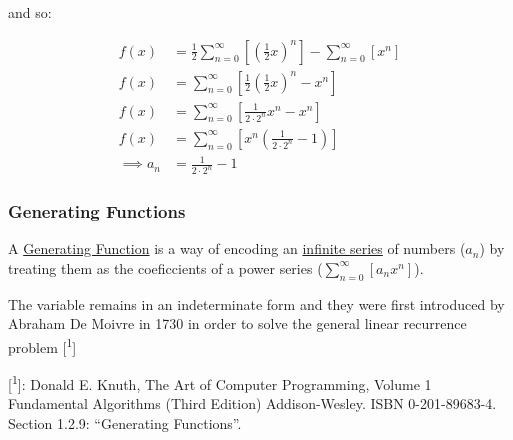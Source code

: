 \documentclass[11pt]{article}
\begin{document}
and so:

\begin{align*}
f\left( x \right) &= \frac{1}{2}\sum^{\infty}_{n= 0}\left[ \left( \frac{1}{2}x \right) ^n \right] - \sum^{\infty}_{n= 0}\left[ x^n \right] \\
f\left( x \right) &= \sum^{\infty}_{n= 0}\left[ \frac{1}{2}\left( \frac{1}{2}x \right) ^n -x^n \right]  \\
f\left( x \right) &= \sum^{\infty}_{n= 0}\left[ \frac{1}{2 \cdot 2^n} x^n -x^n \right]  \\
f\left( x \right) &= \sum^{\infty}_{n= 0}\left[x^n {\left( {\frac{1}{2 \cdot 2^n} -1} \right) } \right]  \\
 \implies  a_n &= \frac{1}{2 \cdot 2^n} - 1
\end{align*}

\subsubsection{Generating Functions}
\label{sec:orgdfa6c3d}
A \href{https://en.wikipedia.org/wiki/Generating\_function}{Generating
Function} is a way of encoding an
\href{https://en.wikipedia.org/wiki/Infinite\_sequence}{infinite series} of
numbers (\(a_n\)) by treating them as the coeficcients of a power series
(\(\sum^\infty_{n = 0} \left[ a_nx^n \right]\)).

The variable remains in an indeterminate form and they were first
introduced by Abraham De Moivre in 1730 in order to solve the general
linear recurrence problem [\textsuperscript{1}]

[\textsuperscript{1}]: Donald E. Knuth, The Art of Computer Programming, Volume 1
Fundamental Algorithms (Third Edition) Addison-Wesley. ISBN
0-201-89683-4. Section 1.2.9: ``Generating Functions''.
\end{document}
